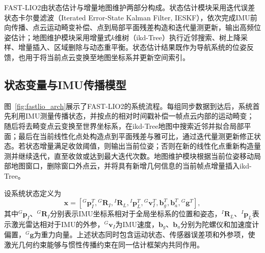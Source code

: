 FAST-LIO2由状态估计与增量地图维护两部分构成。状态估计模块采用迭代误差状态卡尔曼滤波（Iterated Error-State Kalman Filter, IESKF），依次完成IMU前向传播、点云运动畸变补偿、点到局部平面残差构造和迭代量测更新，输出高频位姿估计；地图维护模块采用增量式$k$维树（ikd-Tree）执行近邻搜索、树上降采样、增量插入、区域删除与动态重平衡。状态估计结果既作为导航系统的位姿反馈，也用于将当前点云变换至地图坐标系并更新空间索引。

\subsection{状态变量与IMU传播模型}
图~\ref{fig:fastlio_arch}展示了FAST-LIO2的系统流程。每组同步数据到达后，系统首先利用IMU测量传播状态，并按点的相对时间戳补偿一帧点云内部的运动畸变；随后将去畸变点云变换至世界坐标系，在ikd-Tree地图中搜索近邻并拟合局部平面；最后在当前线性化点处构造点到平面残差与雅可比，通过迭代量测更新修正状态。若状态增量满足收敛阈值，则输出当前位姿；否则在新的线性化点重新构造量测并继续迭代，直至收敛或达到最大迭代次数。地图维护模块根据当前位姿移动局部地图窗口，删除窗口外点云，并将具有新增几何信息的当前帧点增量插入ikd-Tree。

设系统状态定义为
\begin{equation}
    \mathbf{x}
    =
    \left[
    {}^{G}\mathbf{p}_{I}^{T},
    {}^{G}\mathbf{R}_{I},
    {}^{I}\mathbf{R}_{L},
    {}^{I}\mathbf{p}_{L}^{T},
    {}^{G}\mathbf{v}_{I}^{T},
    \mathbf{b}_{g}^{T},
    \mathbf{b}_{a}^{T},
    {}^{G}\mathbf{g}^{T}
    \right],
    \label{eq:fastlio_state}
\end{equation}
其中${}^{G}\mathbf{p}_{I}$、${}^{G}\mathbf{R}_{I}$分别表示IMU坐标系相对于全局坐标系的位置和姿态，${}^{I}\mathbf{R}_{L}$、${}^{I}\mathbf{p}_{L}$表示激光雷达相对于IMU的外参，${}^{G}\mathbf{v}_{I}$为IMU速度，$\mathbf{b}_{g}$、$\mathbf{b}_{a}$分别为陀螺仪和加速度计偏置，${}^{G}\mathbf{g}$为重力向量。上述状态同时包含运动状态、传感器误差项和外参项，使激光几何约束能够与惯性传播约束在同一估计框架内共同作用。

